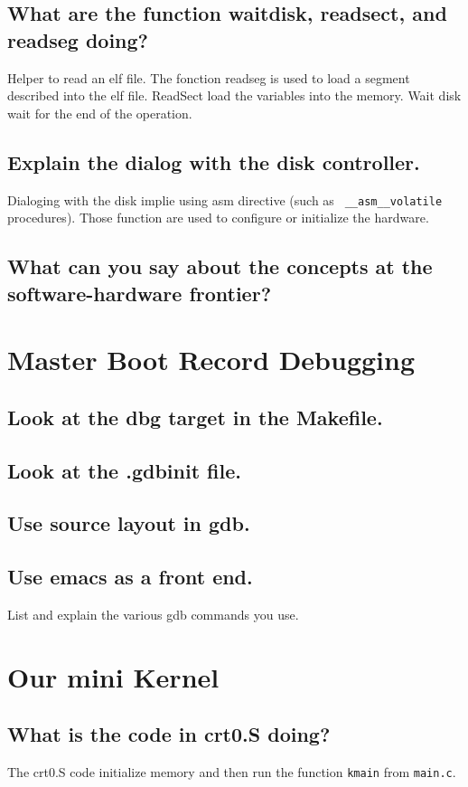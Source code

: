 \documentclass[10]{article}
\begin{document}
\subsection{What are the function waitdisk, readsect, and readseg doing?} 
Helper to read an elf file. The fonction readseg is used to load a segment described into the elf file. ReadSect load the variables into the memory. 
Wait disk wait for the end of the operation.
\subsection{Explain the dialog with the disk controller.}
Dialoging with the disk implie using asm directive (such as \texttt{ \_\_asm\_\_volatile } procedures).
Those function are used to configure or initialize the hardware.
\subsection{What can you say about the concepts at the software-hardware frontier?}

\section{Master Boot Record Debugging}

\subsection{Look at the dbg target in the Makefile.}
\subsection{Look at the .gdbinit file.}
\subsection{Use source layout in gdb.}
\subsection{Use emacs as a front end.}

List and explain the various gdb commands you use.

\section{Our mini Kernel}

\subsection{What is the code in crt0.S doing?}
The crt0.S code initialize  memory and then run the function \texttt{kmain} from \texttt{main.c}.
\end{document}
